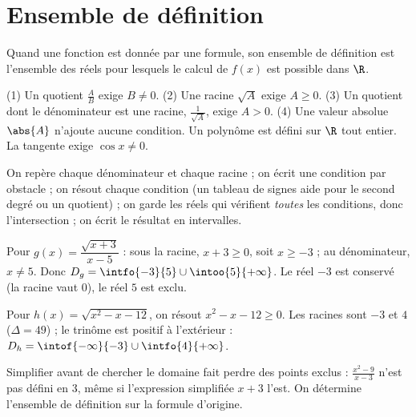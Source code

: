 \section{Ensemble de définition}
Quand une fonction est donnée par une formule, son ensemble de définition est l'ensemble des réels pour lesquels le calcul de $f(x)$ est possible dans $\R$.
\begin{keypoint}
(1) Un quotient $\frac{A}{B}$ exige $B\ne0$. (2) Une racine $\sqrt{A}$ exige $A\ge0$. (3) Un quotient dont le dénominateur est une racine, $\frac{1}{\sqrt{A}}$, exige $A>0$. (4) Une valeur absolue $\abs{A}$ n'ajoute aucune condition. Un polynôme est défini sur $\R$ tout entier. La tangente exige $\cos x\ne0$.
\end{keypoint}
\begin{method}
On repère chaque dénominateur et chaque racine ; on écrit une condition par obstacle ; on résout chaque condition (un tableau de signes aide pour le second degré ou un quotient) ; on garde les réels qui vérifient \emph{toutes} les conditions, donc l'intersection ; on écrit le résultat en intervalles.
\end{method}
\begin{example}
Pour $g(x)=\dfrac{\sqrt{x+3}}{x-5}$ : sous la racine, $x+3\ge0$, soit $x\ge-3$ ; au dénominateur, $x\ne5$. Donc $D_g=\intfo{-3}{5}\cup\intoo{5}{+\infty}$. Le réel $-3$ est conservé (la racine vaut $0$), le réel $5$ est exclu.
\end{example}
\begin{example}
Pour $h(x)=\sqrt{x^2-x-12}$, on résout $x^2-x-12\ge0$. Les racines sont $-3$ et $4$ ($\Delta=49$) ; le trinôme est positif à l'extérieur : $D_h=\intof{-\infty}{-3}\cup\intfo{4}{+\infty}$.
\end{example}
\begin{pitfall}
Simplifier avant de chercher le domaine fait perdre des points exclus : $\frac{x^2-9}{x-3}$ n'est pas défini en $3$, même si l'expression simplifiée $x+3$ l'est. On détermine l'ensemble de définition sur la formule d'origine.
\end{pitfall}

